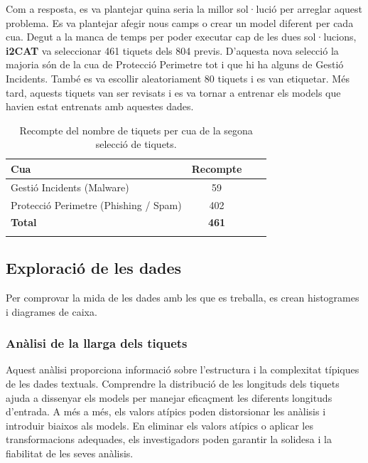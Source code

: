 Com a resposta, es va plantejar quina seria la millor sol·lució per arreglar aquest problema. Es va plantejar afegir nous camps o crear un model diferent per cada cua. Degut a la manca de temps per poder executar cap de les dues sol·lucions, \textbf{i2CAT} va seleccionar 461 tiquets dels 804 previs. D'aquesta nova selecció la majoria són de la cua de Protecció Perimetre tot i que hi ha alguns de Gestió Incidents. També es va escollir aleatoriament 80 tiquets i es van etiquetar. Més tard, aquests tiquets van ser revisats i es va tornar a entrenar els models que havien estat entrenats amb aquestes dades. 

\begin{table}[H]
  \centering
  \begin{tabular}{lccr}
      \Xhline{2\arrayrulewidth}
      \textbf{Cua} & \textbf{Recompte} \\
      \hline
      Gestió Incidents (Malware) & 59 \\
      Protecció Perimetre (Phishing / Spam) & 402  \\
      \hline
      \textbf{Total} & \textbf{461} \\
      \Xhline{2\arrayrulewidth}
  \end{tabular}
  \caption{Recompte del nombre de tiquets per cua de la segona selecció de tiquets.}
  \label{tab:recompte_per_cua_2}
\end{table}





\subsection{Exploració de les dades}
Per comprovar la mida de les dades amb les que es treballa, es crean histogrames i diagrames de caixa.

\subsubsection{Anàlisi de la llarga dels tiquets}
Aquest anàlisi proporciona informació sobre l'estructura i la complexitat típiques de les dades textuals. Comprendre la distribució de les longituds dels tiquets ajuda a dissenyar els models per manejar eficaçment les diferents longituds d'entrada. A més a més, els valors atípics poden distorsionar les anàlisis i introduir biaixos als models. En eliminar els valors atípics o aplicar les transformacions adequades, els investigadors poden garantir la solidesa i la fiabilitat de les seves anàlisis.


